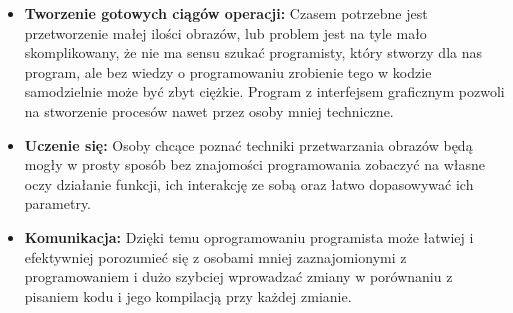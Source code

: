 \begin{itemize}
    \item \textbf{Tworzenie gotowych ciągów operacji:} 
    Czasem potrzebne jest przetworzenie małej ilości obrazów, lub problem jest na tyle mało skomplikowany, że nie ma sensu szukać programisty, który stworzy dla nas program, ale bez wiedzy o programowaniu zrobienie tego w kodzie samodzielnie może być zbyt ciężkie. 
    Program z interfejsem graficznym pozwoli na stworzenie procesów nawet przez osoby mniej techniczne.
    \item \textbf{Uczenie się:} 
    Osoby chcące poznać techniki przetwarzania obrazów będą mogły w prosty sposób bez znajomości programowania zobaczyć na własne oczy działanie funkcji, ich interakcję ze sobą oraz łatwo dopasowywać ich parametry. 
    \item \textbf{Komunikacja:} 
    Dzięki temu oprogramowaniu programista może łatwiej i efektywniej porozumieć się z osobami mniej zaznajomionymi z programowaniem i dużo szybciej wprowadzać zmiany w porównaniu z pisaniem kodu i jego kompilacją przy każdej zmianie.
\end{itemize}